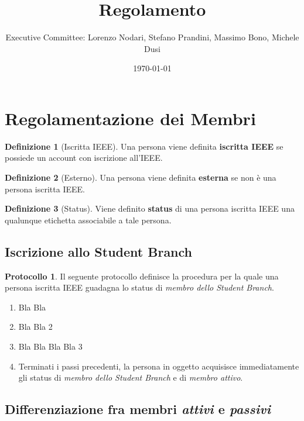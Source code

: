 \documentclass[]{article}
\title{Regolamento}
\author{Executive Committee: Lorenzo Nodari, Stefano Prandini, Massimo Bono, Michele Dusi}
\date{\today}
\theoremstyle{definition}
\newtheorem{defn}{Definizione}[section]
\newtheorem{prot}{Protocollo}[subsection]
\renewcommand{\i}[1]{\textit{#1}}
\renewcommand{\b}[1]{\textbf{#1}}
\begin{document}
\maketitle

\newpage

\section{Regolamentazione dei Membri}

\begin{defn}[Iscritta IEEE]
	Una persona viene definita \b{iscritta IEEE} se possiede un account con iscrizione all'IEEE.
\end{defn}

\begin{defn}[Esterno]
	Una persona viene definita \b{esterna} se non è una persona iscritta IEEE.
\end{defn}

\begin{defn}[Status]
	Viene definito \b{status} di una persona iscritta IEEE una qualunque etichetta associabile a tale persona.
\end{defn}

\subsection{Iscrizione allo Student Branch}

\begin{prot}
	\label{Iscrizione allo Student Branch IEEE}
	Il seguente protocollo definisce la procedura per la quale una persona iscritta IEEE guadagna lo status di \i{membro dello Student Branch}.
	\begin{enumerate}
		\item Bla Bla
		\item Bla Bla 2
		\item Bla Bla Bla Bla 3
		\item Terminati i passi precedenti, la persona in oggetto acquisisce immediatamente gli status di \i{membro dello Student Branch} e di \i{membro attivo}.
	\end{enumerate}
\end{prot}

\subsection{Differenziazione fra membri \i{attivi} e \i{passivi}}

\end{document}
